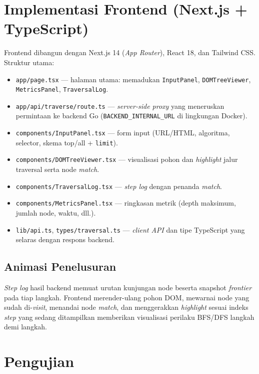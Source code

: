 \section{Implementasi Frontend (Next.js + TypeScript)}

Frontend dibangun dengan Next.js 14 (\textit{App Router}), React 18, dan Tailwind CSS. Struktur utama:

\begin{itemize}
    \item \texttt{app/page.tsx} --- halaman utama: memadukan \texttt{InputPanel}, \texttt{DOMTreeViewer}, \texttt{MetricsPanel}, \texttt{TraversalLog}.
    \item \texttt{app/api/traverse/route.ts} --- \textit{server-side proxy} yang meneruskan permintaan ke backend Go (\texttt{BACKEND\_INTERNAL\_URL} di lingkungan Docker).
    \item \texttt{components/InputPanel.tsx} --- form input (URL/HTML, algoritma, selector, skema top/all + \texttt{limit}).
    \item \texttt{components/DOMTreeViewer.tsx} --- visualisasi pohon dan \textit{highlight} jalur traversal serta node \textit{match}.
    \item \texttt{components/TraversalLog.tsx} --- \textit{step log} dengan penanda \textit{match}.
    \item \texttt{components/MetricsPanel.tsx} --- ringkasan metrik (depth maksimum, jumlah node, waktu, dll.).
    \item \texttt{lib/api.ts}, \texttt{types/traversal.ts} --- \textit{client API} dan tipe TypeScript yang selaras dengan respons backend.
\end{itemize}

\subsection{Animasi Penelusuran}
\textit{Step log} hasil backend memuat urutan kunjungan node beserta snapshot \textit{frontier} pada tiap langkah. Frontend merender-ulang pohon DOM, mewarnai node yang sudah di-\textit{visit}, menandai node \textit{match}, dan menggerakkan \textit{highlight} sesuai indeks \textit{step} yang sedang ditampilkan memberikan visualisasi perilaku BFS/DFS langkah demi langkah.

\section{Pengujian}


